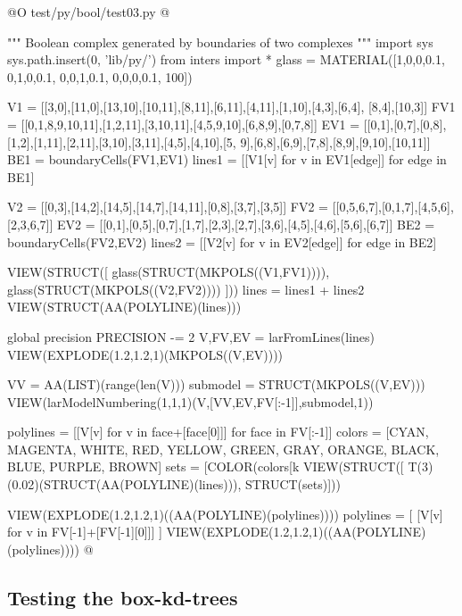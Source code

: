 \documentclass[11pt,oneside]{article}    %
\begin{document}
@O test/py/bool/test03.py
@{""" Boolean complex generated by boundaries of two complexes """
import sys
sys.path.insert(0, 'lib/py/')
from inters import *
glass = MATERIAL([1,0,0,0.1,  0,1,0,0.1,  0,0,1,0.1, 0,0,0,0.1, 100])

V1 = [[3,0],[11,0],[13,10],[10,11],[8,11],[6,11],[4,11],[1,10],[4,3],[6,4],
        [8,4],[10,3]]
FV1 = [[0,1,8,9,10,11],[1,2,11],[3,10,11],[4,5,9,10],[6,8,9],[0,7,8]]
EV1 = [[0,1],[0,7],[0,8],[1,2],[1,11],[2,11],[3,10],[3,11],[4,5],[4,10],[5,
        9],[6,8],[6,9],[7,8],[8,9],[9,10],[10,11]]
BE1 = boundaryCells(FV1,EV1)
lines1 = [[V1[v] for v in EV1[edge]] for edge in BE1]

V2 = [[0,3],[14,2],[14,5],[14,7],[14,11],[0,8],[3,7],[3,5]]
FV2 = [[0,5,6,7],[0,1,7],[4,5,6],[2,3,6,7]]
EV2 = [[0,1],[0,5],[0,7],[1,7],[2,3],[2,7],[3,6],[4,5],[4,6],[5,6],[6,7]]
BE2 = boundaryCells(FV2,EV2)
lines2 = [[V2[v] for v in EV2[edge]] for edge in BE2]

VIEW(STRUCT([ glass(STRUCT(MKPOLS((V1,FV1)))), glass(STRUCT(MKPOLS((V2,FV2)))) ]))
lines = lines1 + lines2
VIEW(STRUCT(AA(POLYLINE)(lines)))

global precision
PRECISION -= 2
V,FV,EV = larFromLines(lines)
VIEW(EXPLODE(1.2,1.2,1)(MKPOLS((V,EV))))

VV = AA(LIST)(range(len(V)))
submodel = STRUCT(MKPOLS((V,EV)))
VIEW(larModelNumbering(1,1,1)(V,[VV,EV,FV[:-1]],submodel,1))

polylines = [[V[v] for v in face+[face[0]]] for face in FV[:-1]]
colors = [CYAN, MAGENTA, WHITE, RED, YELLOW, GREEN, GRAY, ORANGE, BLACK, BLUE, PURPLE, BROWN]
sets = [COLOR(colors[k%
VIEW(STRUCT([ T(3)(0.02)(STRUCT(AA(POLYLINE)(lines))), STRUCT(sets)]))

VIEW(EXPLODE(1.2,1.2,1)((AA(POLYLINE)(polylines))))
polylines = [ [V[v] for v in FV[-1]+[FV[-1][0]]] ]
VIEW(EXPLODE(1.2,1.2,1)((AA(POLYLINE)(polylines))))
@}



\subsection{Testing the box-kd-trees}
\end{document}
